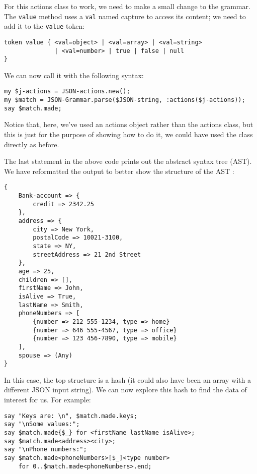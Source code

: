 For this actions class to work, we need to make a small change 
to the grammar. The {\tt value} method uses a {\tt val} named 
capture to access its content; we need to add it to the 
{\tt value} token:

\begin{verbatim}
token value { <val=object> | <val=array> | <val=string> 
              | <val=number> | true | false | null
}
\end{verbatim}

We can now call it with the following syntax:

\begin{verbatim}
my $j-actions = JSON-actions.new();
my $match = JSON-Grammar.parse($JSON-string, :actions($j-actions));
say $match.made;
\end{verbatim}

Notice that, here, we've used an actions object rather than the
actions class, but this is just for the purpose of showing 
how to do it, we could have used the class directly as before.

The last statement in the above code prints out the abstract syntax 
tree (AST). We have reformatted the output to better show the 
structure of the AST :

\begin{verbatim}
{
    Bank-account => {
        credit => 2342.25
    }, 
    address => {
        city => New York, 
        postalCode => 10021-3100, 
        state => NY, 
        streetAddress => 21 2nd Street
    }, 
    age => 25, 
    children => [], 
    firstName => John, 
    isAlive => True, 
    lastName => Smith, 
    phoneNumbers => [
        {number => 212 555-1234, type => home} 
        {number => 646 555-4567, type => office} 
        {number => 123 456-7890, type => mobile}
    ], 
    spouse => (Any)
}
\end{verbatim}

In this case, the top structure is a hash (it could also have been 
an array with a different JSON input string). We can now explore 
this hash to find the data of interest for us. For example:

\begin{verbatim}
say "Keys are: \n", $match.made.keys;
say "\nSome values:";
say $match.made{$_} for <firstName lastName isAlive>;
say $match.made<address><city>;
say "\nPhone numbers:";
say $match.made<phoneNumbers>[$_]<type number> 
    for 0..$match.made<phoneNumbers>.end;
\end{verbatim}

